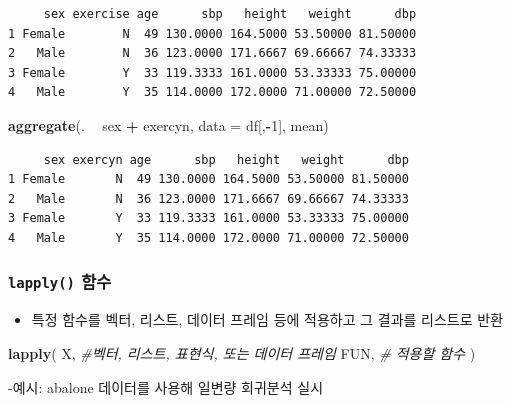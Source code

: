 \documentclass[
  11pt,
]{krantz}
\newenvironment{Shaded}{\begin{snugshade}}{\end{snugshade}}
\newcommand{\CommentTok}[1]{\textcolor[rgb]{0.37,0.37,0.37}{\textit{#1}}}
\newcommand{\DataTypeTok}[1]{\textcolor[rgb]{0.27,0.27,0.27}{#1}}
\newcommand{\DecValTok}[1]{\textcolor[rgb]{0.06,0.06,0.06}{#1}}
\newcommand{\KeywordTok}[1]{\textcolor[rgb]{0.27,0.27,0.27}{\textbf{#1}}}
\newcommand{\NormalTok}[1]{#1}
\newcommand{\OperatorTok}[1]{\textcolor[rgb]{0.43,0.43,0.43}{\textbf{#1}}}
\newcommand{\StringTok}[1]{\textcolor[rgb]{0.5,0.5,0.5}{#1}}
\providecommand{\tightlist}{%
  \setlength{\itemsep}{0pt}\setlength{\parskip}{0pt}}
\begin{document}
\begin{verbatim}
     sex exercise age      sbp   height   weight      dbp
1 Female        N  49 130.0000 164.5000 53.50000 81.50000
2   Male        N  36 123.0000 171.6667 69.66667 74.33333
3 Female        Y  33 119.3333 161.0000 53.33333 75.00000
4   Male        Y  35 114.0000 172.0000 71.00000 72.50000
\end{verbatim}

\begin{Shaded}
\begin{Highlighting}[]
\KeywordTok{aggregate}\NormalTok{(. }\OperatorTok{~}\StringTok{ }\NormalTok{sex }\OperatorTok{+}\StringTok{ }\NormalTok{exercyn, }
          \DataTypeTok{data =}\NormalTok{ df[,}\OperatorTok{-}\DecValTok{1}\NormalTok{], }
\NormalTok{          mean)}
\end{Highlighting}
\end{Shaded}

\begin{verbatim}
     sex exercyn age      sbp   height   weight      dbp
1 Female       N  49 130.0000 164.5000 53.50000 81.50000
2   Male       N  36 123.0000 171.6667 69.66667 74.33333
3 Female       Y  33 119.3333 161.0000 53.33333 75.00000
4   Male       Y  35 114.0000 172.0000 71.00000 72.50000
\end{verbatim}

\normalsize

\hypertarget{lapply}{%
\subsubsection*{\texorpdfstring{\texttt{lapply()} 함수}{lapply() 함수}}\label{lapply}}


\begin{itemize}
\tightlist
\item
  특정 함수를 벡터, 리스트, 데이터 프레임 등에 적용하고 그 결과를 리스트로 반환
\end{itemize}

\footnotesize

\begin{Shaded}
\begin{Highlighting}[]
\KeywordTok{lapply}\NormalTok{(}
\NormalTok{ X, }\CommentTok{#벡터, 리스트, 표현식, 또는  데이터 프레임}
\NormalTok{ FUN, }\CommentTok{# 적용할 함수}
\NormalTok{)}
\end{Highlighting}
\end{Shaded}

\normalsize

-예시: abalone 데이터를 사용해 일변량 회귀분석 실시
\end{document}
